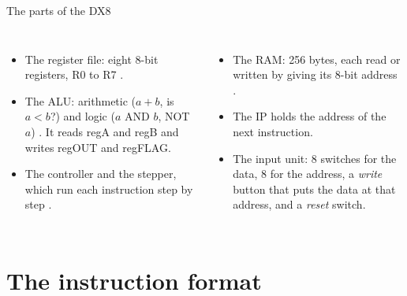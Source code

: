 \documentclass[10pt]{wosm-slides}
\begin{document}
\begin{frame}{The parts of the DX8}
  \begin{columns}[T, totalwidth=\textwidth]
      \begin{itemize}
        \item The \alert{register file}: eight 8-bit registers, R0 to R7
          .
        \item The \alert{ALU}: arithmetic ($a + b$, is $a < b$?) and logic
          ($a$ AND $b$, NOT $a$) . It reads regA and regB and
          writes regOUT and regFLAG.
        \item The \alert{controller} and the \alert{stepper}, which run each
          instruction step by step .
      \end{itemize}
      \begin{itemize}
        \item The \alert{RAM}: 256 bytes, each read or written by giving its 8-bit
          address .
        \item The \alert{IP} holds the address of the next instruction.
        \item The input unit: 8 switches for the data, 8 for the address, a
          \emph{write} button that puts the data at that address, and a
          \emph{reset} switch.
      \end{itemize}
  \end{columns}
\end{frame}

\section{The instruction format}
\end{document}
